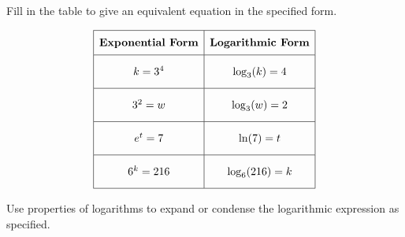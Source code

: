 \documentclass[addpoints]{exam}
\begin{document}
\begin{questions}
\question[5] Fill in the table to give an equivalent equation in the specified form.\\
{\centering {\renewcommand{\arraystretch}{3}
\[
\begin{array}{|c|c|} \hline  \textbf{Exponential Form} & \textbf{Logarithmic Form} \\ \hline  k = 3^{4} & \hspace{75mm} \\ \hline  3^{2} = w & \hspace{75mm} \\ \hline  \hspace{75mm} & \ln(7) = t \\ \hline  \hspace{75mm} & \log_{6}(216) = k \\ \hline \end{array}
\]
}}
\begin{solution}
\[\begin{array}{|c|c|} \hline \rule[-0.8em]{0pt}{2.2em} \textbf{Exponential Form} & \textbf{Logarithmic Form} \\ \hline \rule[-1.2em]{0pt}{3em} k = 3^{4} & \log_{3}(k) = 4 \\ \hline \rule[-1.2em]{0pt}{3em} 3^{2} = w & \log_{3}(w) = 2 \\ \hline \rule[-1.2em]{0pt}{3em} e^{t} = 7 & \ln(7) = t \\ \hline \rule[-1.2em]{0pt}{3em} 6^{k} = 216 & \log_{6}(216) = k \\ \hline \end{array}\]
\end{solution}

\question Use properties of logarithms to expand or condense the logarithmic expression as specified.
\end{questions}
\end{document}
